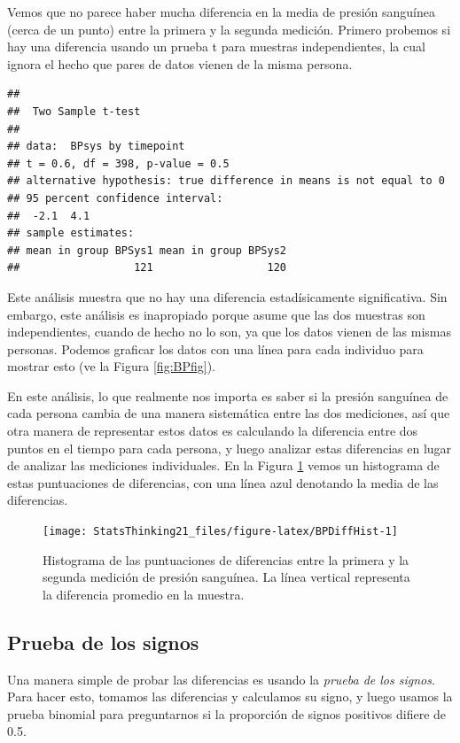 \documentclass[
  12pt,
]{book}
\theoremstyle{definition}
\theoremstyle{definition}
\theoremstyle{definition}
\theoremstyle{remark}
\begin{document}
Vemos que no parece haber mucha diferencia en la media de presión sanguínea (cerca de un punto) entre la primera y la segunda medición. Primero probemos si hay una diferencia usando un prueba t para muestras independientes, la cual ignora el hecho que pares de datos vienen de la misma persona.

\begin{verbatim}
## 
## 	Two Sample t-test
## 
## data:  BPsys by timepoint
## t = 0.6, df = 398, p-value = 0.5
## alternative hypothesis: true difference in means is not equal to 0
## 95 percent confidence interval:
##  -2.1  4.1
## sample estimates:
## mean in group BPSys1 mean in group BPSys2 
##                  121                  120
\end{verbatim}

Este análisis muestra que no hay una diferencia estadísicamente significativa. Sin embargo, este análisis es inapropiado porque asume que las dos muestras son independientes, cuando de hecho no lo son, ya que los datos vienen de las mismas personas. Podemos graficar los datos con una línea para cada individuo para mostrar esto (ve la Figura \ref{fig:BPfig}).

En este análisis, lo que realmente nos importa es saber si la presión sanguínea de cada persona cambia de una manera sistemática entre las dos mediciones, así que otra manera de representar estos datos es calculando la diferencia entre dos puntos en el tiempo para cada persona, y luego analizar estas diferencias en lugar de analizar las mediciones individuales. En la Figura \ref{fig:BPDiffHist} vemos un histograma de estas puntuaciones de diferencias, con una línea azul denotando la media de las diferencias.

\begin{figure}
\texttt{[image: StatsThinking21\_files/figure-latex/BPDiffHist-1]} \caption{Histograma de las puntuaciones de diferencias entre la primera y la segunda medición de presión sanguínea. La línea vertical representa la diferencia promedio en la muestra.}\label{fig:BPDiffHist}
\end{figure}

\hypertarget{prueba-de-los-signos}{%
\subsection{Prueba de los signos}\label{prueba-de-los-signos}}

Una manera simple de probar las diferencias es usando la \emph{prueba de los signos}. Para hacer esto, tomamos las diferencias y calculamos su signo, y luego usamos la prueba binomial para preguntarnos si la proporción de signos positivos difiere de 0.5.
\end{document}
